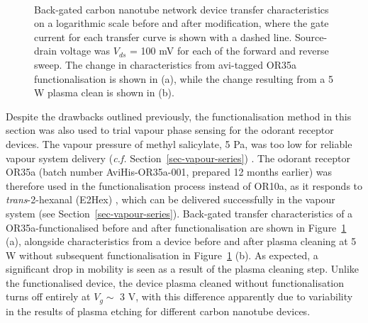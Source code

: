 \documentclass[
  a4paper,
]{scrbook}
\begin{document}
\begin{figure}
\begin{minipage}[t]{0.45\linewidth}
{{}

}

\end{minipage}%
%
\begin{minipage}[t]{0.01\linewidth}

{\centering 

~

}

\end{minipage}%

\caption{\label{fig-OR35a-TX-comparison}Back-gated carbon nanotube
network device transfer characteristics on a logarithmic scale before
and after modification, where the gate current for each transfer curve
is shown with a dashed line. Source-drain voltage was \(V_{ds}\) = 100
mV for each of the forward and reverse sweep. The change in
characteristics from avi-tagged OR35a functionalisation is shown in (a),
while the change resulting from a 5 W plasma clean is shown in (b).}

\end{figure}

Despite the drawbacks outlined previously, the functionalisation method
in this section was also used to trial vapour phase sensing for the
odorant receptor devices. The vapour pressure of methyl salicylate, 5
Pa, was too low for reliable vapour system delivery (\emph{c.f.}
Section~\ref{sec-vapour-series}) \autocite{MeSal}. The odorant receptor
OR35a (batch number AviHis-OR35a-001, prepared 12 months earlier) was
therefore used in the functionalisation process instead of OR10a, as it
responds to \emph{trans}-2-hexanal (E2Hex) \autocite{Murugathas2019a},
which can be delivered successfully in the vapour system (see
Section~\ref{sec-vapour-series}). Back-gated transfer characteristics of
a OR35a-functionalised before and after functionalisation are shown in
Figure~\ref{fig-OR35a-TX-comparison} (a), alongside characteristics from
a device before and after plasma cleaning at 5 W without subsequent
functionalisation in Figure~\ref{fig-OR35a-TX-comparison} (b). As
expected, a significant drop in mobility is seen as a result of the
plasma cleaning step. Unlike the functionalised device, the device
plasma cleaned without functionalisation turns off entirely at
\(V_g \sim\) 3 V, with this difference apparently due to variability in
the results of plasma etching for different carbon nanotube devices.
\end{document}
